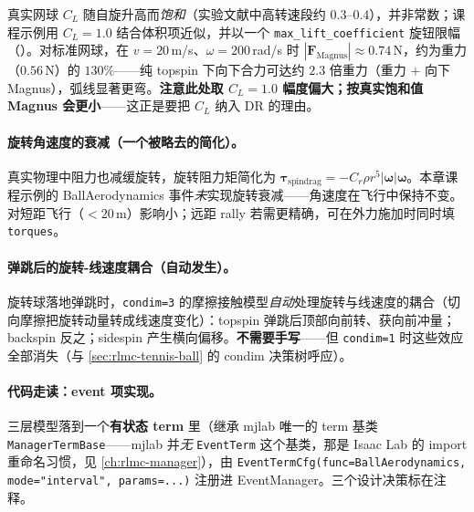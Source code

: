 真实网球 $C_L$ 随自旋升高而\emph{饱和}（实验文献中高转速段约 $0.3$--$0.4$），并非常数；课程示例用 $C_L=1.0$ 结合体积项近似，并以一个 \texttt{max\_lift\_coefficient} 旋钮限幅（）。对标准网球，在 $v=20$\,m/s、$\omega=200$\,rad/s 时 $|\mathbf F_{\text{Magnus}}|\approx0.74$\,N，约为重力（$0.56$\,N）的 $130\%$——纯 topspin 下向下合力可达约 $2.3$ 倍重力（重力 $+$ 向下 Magnus），弧线显著更弯。\textbf{注意此处取 $C_L=1.0$ 幅度偏大；按真实饱和值 Magnus 会更小}——这正是要把 $C_L$ 纳入 DR 的理由。

\paragraph{旋转角速度的衰减（一个被略去的简化）。}真实物理中阻力也减缓旋转，旋转阻力矩简化为 $\boldsymbol\tau_{\text{spindrag}}=-C_r\rho r^5|\boldsymbol\omega|\boldsymbol\omega$。本章课程示例的 BallAerodynamics 事件\emph{未}实现旋转衰减——角速度在飞行中保持不变。对短距飞行（$<20$\,m）影响小；远距 rally 若需更精确，可在外力施加时同时填 \verb|torques|。

\paragraph{弹跳后的旋转-线速度耦合（自动发生）。}旋转球落地弹跳时，\verb|condim=3| 的摩擦接触模型\emph{自动}处理旋转与线速度的耦合（切向摩擦把旋转动量转成线速度变化）：topspin 弹跳后顶部向前转、获向前冲量；backspin 反之；sidespin 产生横向偏移。\textbf{不需要手写}——但 \verb|condim=1| 时这些效应全部消失（与 \cref{sec:rlmc-tennis-ball} 的 condim 决策树呼应）。

\paragraph{代码走读：event 项实现。}三层模型落到一个\textbf{有状态 term} 里（继承 mjlab 唯一的 term 基类 \verb|ManagerTermBase|——mjlab 并\emph{无} \verb|EventTerm| 这个基类，那是 Isaac Lab 的 import 重命名习惯，见 \cref{ch:rlmc-manager}），由 \verb|EventTermCfg(func=BallAerodynamics, mode="interval", params=...)| 注册进 EventManager。三个设计决策标在注释。

